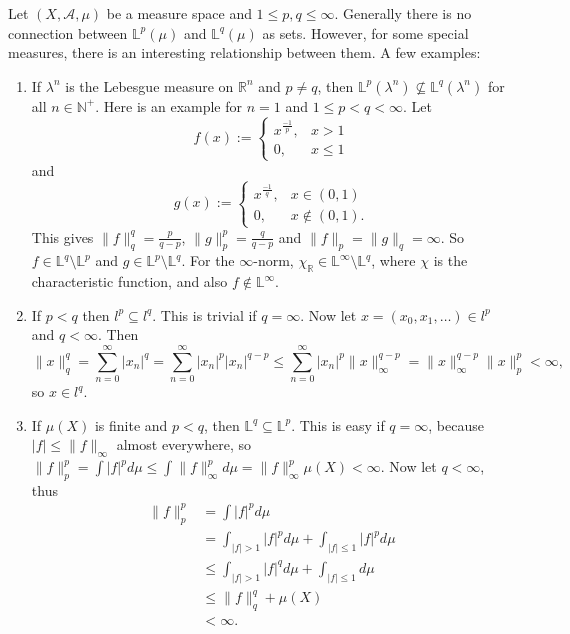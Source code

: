 \documentclass[12pt]{article}
\def\L{\mathbb{L}}
\def\R{\mathbb{R}}
\begin{document}

Let $(X,\mathcal{A},\mu)$ be a measure space and $1\leq p,q \leq\infty$.
Generally there is no connection between
$\L^p(\mu)$ and $\L^q(\mu)$ as sets.
However, for some special measures,
there is an interesting relationship between them.
A few examples:
\begin{enumerate}
\item If $\lambda^n$ is the Lebesgue measure on $\R^n$ and $p\neq q$,
then $\L^p(\lambda^n)\not\subseteq \L^q(\lambda^n)$
for all $n\in\mathbb{N}^+$.
Here is an example for $n=1$ and $1\leq p<q<\infty$.
Let
\[
  f(x):=\begin{cases}
  x^{\frac{-1}{p}},& x>1 \\
  0,& x \leq 1
  \end{cases}
\]
and
\[
  g(x):=\begin{cases}
  x^{\frac{-1}{q}},& x\in(0,1) \\
  0,& x\not\in (0,1).
  \end{cases}
\]
This gives $\|f\|_q^q=\frac{p}{q-p}$, $\|g\|_p^p=\frac{q}{q-p}$
and $\|f\|_p=\|g\|_q=\infty$.
So $f\in\L^q\setminus\L^p$ and $g\in\L^p\setminus\L^q$.
For the $\infty$-norm,
$\chi_\R\in\L^\infty\setminus\L^q$,
where $\chi$ is the characteristic function,
and also $f\not\in\L^\infty$. 
\item If $p<q$ then $l^p\subseteq l^q$.
This is trivial if $q = \infty$.
Now let $x=(x_0,x_1,\dots)\in l^p$ and $q<\infty$.
Then
\[
  \|x\|_q^q = \sum_{n=0}^\infty |x_n|^q = \sum_{n=0}^\infty |x_n|^p |x_n|^{q-p} \leq \sum_{n=0}^\infty |x_n|^p \|x\|_\infty^{q-p} = \|x\|_\infty^{q-p} \|x\|_p^p <\infty,
\]
so $x\in l^q$.
\item If $\mu(X)$ is finite and $p<q$,
then $\L^q \subseteq \L^p$.
This is easy if $q = \infty$,
because $|f|\leq\|f\|_\infty$ almost everywhere,
so $\|f\|_p^p= \int |f|^p d\mu \leq \int \|f\|_\infty^p d\mu
= \|f\|_\infty^p \mu(X)<\infty$.
Now let $q<\infty$,
thus 
\begin{align*}
  \|f\|_p^p&=\int |f|^p d\mu \\
  &=\int_{|f|>1}|f|^p d\mu + \int_{|f|\leq 1}|f|^p d\mu \\
  &\leq \int_{|f|>1}|f|^q d\mu + \int_{|f|\leq 1}d\mu \\
  &\leq \|f\|_q^q+\mu(X) \\
  &<\infty.
\end{align*}
\end{enumerate}
\end{document}
